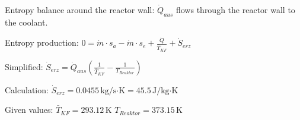 Entropy balance around the reactor wall:  
\( \dot{Q}_{aus} \) flows through the reactor wall to the coolant.  

Entropy production:  
\( 0 = \dot{m} \cdot s_{a} - \dot{m} \cdot s_{e} + \frac{\dot{Q}}{\bar{T}_{KF}} + \dot{S}_{erz} \)  

Simplified:  
\( \dot{S}_{erz} = \dot{Q}_{aus} \left( \frac{1}{\bar{T}_{KF}} - \frac{1}{T_{Reaktor}} \right) \)  

Calculation:  
\( \dot{S}_{erz} = 0.0455 \, \text{kg/s·K} = 45.5 \, \text{J/kg·K} \)  

Given values:  
\( \bar{T}_{KF} = 293.12 \, \text{K} \)  
\( T_{Reaktor} = 373.15 \, \text{K} \)